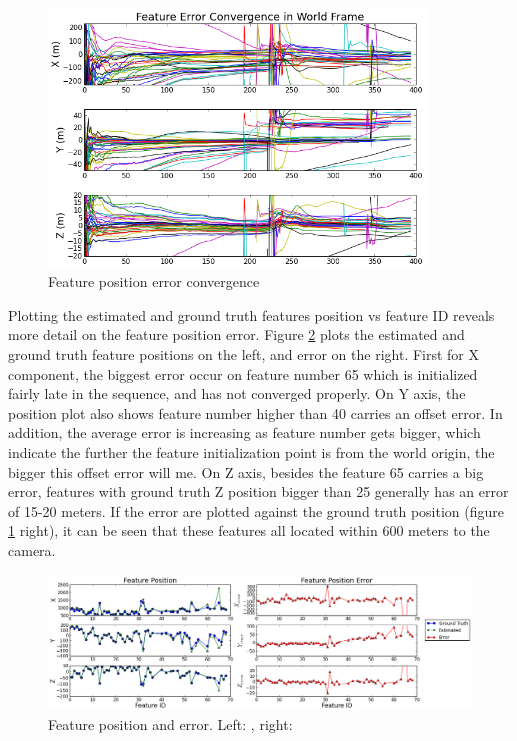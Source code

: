 \begin{figure}[h]
\centering
\includegraphics[width=10cm, keepaspectratio=true]
{./Figures/fltfig/cut1/Figure50.png}
\caption{Feature position error convergence}
\label{fltfig:8}
\end{figure}

Plotting the estimated and ground truth features position vs feature
ID reveals more detail on the feature position error. Figure
\ref{fltfig:9} plots the estimated and ground truth feature positions
on the left, and error on the right. First for X component, the biggest
error occur on feature number 65 which is initialized fairly late in
the sequence, and has not converged properly. On Y axis, the position
plot also shows feature number higher than 40 carries an offset error.
In addition, the average error is increasing as feature number gets
bigger, which indicate the further the feature initialization point is
from the world origin, the bigger this offset error will me. On Z
axis, besides the feature 65 carries a big error, features with ground
truth Z position bigger than 25 generally has an error of 15-20
meters. If the error are plotted against the ground truth position
(figure \ref{fltfig:8} right), it can be seen that these features all
located within 600 meters to the camera.

\begin{figure}[h]
\centering
\includegraphics[width=14cm, keepaspectratio=true]
{./Figures/fltfig/cut1/Figure60.png}
\caption{Feature position and error. Left: , right: }
\label{fltfig:9}
\end{figure}

